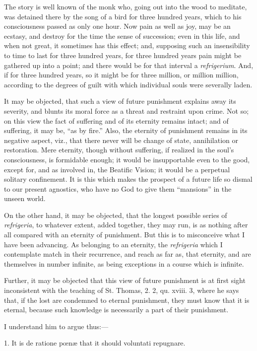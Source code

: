 The story is well known of the monk who, going out into the wood to
meditate, was detained there by the song of a bird for three hundred
years, which to his consciousness passed as only one hour. Now pain as
well as joy, may be an ecstasy, and destroy for the time the sense of
succession; even in this life, and when not great, it sometimes has
this effect; and, supposing such an insensibility to time to last for
three hundred years, for three hundred years pain might be gathered up
into a point; and there would be for that interval a \emph{refrigerium}.
And, if for three hundred years, so it might be for three million, or
million million, according to the degrees of guilt with which
individual souls were severally laden.


It may be objected, that such a view of future punishment explains
away its severity, and blunts its moral force as a threat and
restraint upon crime. Not so; on this view the fact of suffering and
of its eternity remains intact; and of suffering, it may be, ``as
by fire.'' Also, the eternity of punishment remains in its
negative aspect, viz., that there never will be change of state,
annihilation or restoration. Mere eternity, though without suffering,
if realized in the soul's consciousness, is formidable enough; it
would be insupportable even to the good, except for, and as involved
in, the Beatific Vision; it would be a perpetual solitary confinement.
It is this which makes the prospect of a future life so dismal to our
present agnostics, who have no God to give them ``mansions''
in the unseen world.


On the other hand, it may be objected, that the longest possible
series of \emph{refrigeria}, to whatever extent, added together, they
may run, is as nothing after all compared with an eternity of
punishment. But this is to misconceive what I have been advancing. As
belonging to an eternity, the \emph{refrigeria} which I contemplate
match in their recurrence, and reach as far as, that eternity, and
are themselves in number infinite, as being exceptions in a
course which is infinite.


Further, it may be objected that this view of future punishment is
at first sight inconsistent with the teaching of St. Thomas, 2. 2, qu.
xviii. 3, where he says that, if the lost are condemned to eternal
punishment, they must know that it is eternal, because such knowledge
is necessarily a part of their punishment.


I understand him to argue thus:—


1. It is de ratione pœnæ that it should voluntati repugnare.


